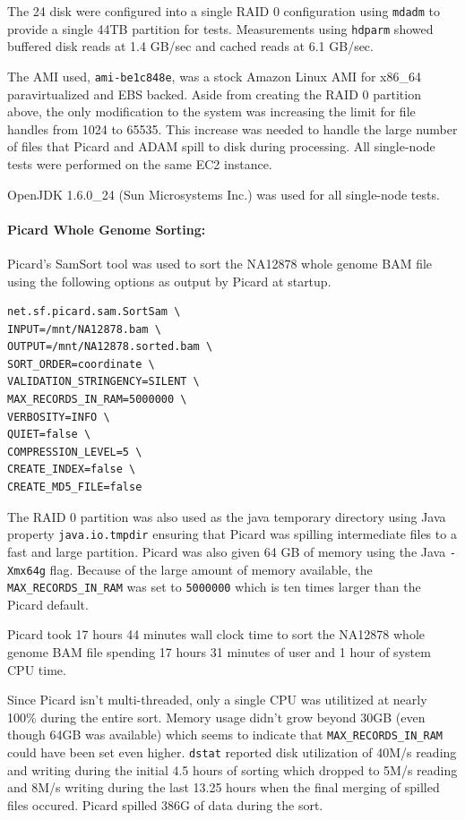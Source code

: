 \documentclass[10pt,twocolumn]{article}
\theoremstyle{plain}
\begin{document}
The 24 disk were configured into a single RAID 0 configuration using \texttt{mdadm} to provide a single 44TB partition for tests.
Measurements using \texttt{hdparm} showed buffered disk reads at 1.4 GB/sec and cached reads at 6.1 GB/sec.

The AMI used, \texttt{ami-be1c848e}, was a stock Amazon Linux AMI for x86\_64 paravirtualized and EBS backed. Aside
from creating the RAID 0 partition above, the only modification to the system was increasing the limit for file
handles from 1024 to 65535. This increase was needed to handle the large number of files that Picard and ADAM spill to disk during
processing. All single-node tests were performed on the same EC2 instance.

OpenJDK 1.6.0\_24 (Sun Microsystems Inc.) was used for all single-node tests.

\paragraph{Picard Whole Genome Sorting:}
\label{sec:single-sort-picard}

Picard's SamSort tool was used to sort the NA12878 whole genome BAM file using the following options as output
by Picard at startup.

\begin{lstlisting}
net.sf.picard.sam.SortSam \
INPUT=/mnt/NA12878.bam \
OUTPUT=/mnt/NA12878.sorted.bam \
SORT_ORDER=coordinate \
VALIDATION_STRINGENCY=SILENT \
MAX_RECORDS_IN_RAM=5000000 \
VERBOSITY=INFO \
QUIET=false \
COMPRESSION_LEVEL=5 \
CREATE_INDEX=false \
CREATE_MD5_FILE=false
\end{lstlisting}

The RAID 0 partition was also used as the java temporary directory using Java property
\texttt{java.io.tmpdir} ensuring that Picard was spilling intermediate files to a fast and large partition.
Picard was also given 64 GB of memory using the Java \texttt{-Xmx64g} flag. Because of the large amount of memory available,
the \texttt{MAX\_RECORDS\_IN\_RAM} was set to \texttt{5000000} which is ten times larger than the Picard default.

Picard took 17 hours 44 minutes wall clock time to sort the NA12878 whole genome BAM file spending 17 hours 31 minutes of user and
1 hour of system CPU time.

Since Picard isn't multi-threaded, only a
single CPU was utilitized at nearly 100\% during the entire sort. Memory usage didn't grow beyond 30GB (even
though 64GB was available) which seems to indicate that \texttt{MAX\_RECORDS\_IN\_RAM} could have been set even higher.
\texttt{dstat} reported disk utilization of 40M/s reading and writing during the initial 4.5 hours of sorting which
dropped to 5M/s reading and 8M/s writing during the last 13.25 hours when the final merging of spilled files occured.
Picard spilled 386G of data during the sort.
\end{document}
